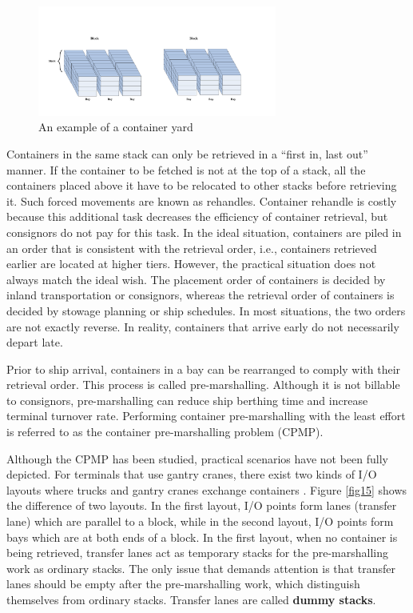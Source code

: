 \documentclass[review,3p,times,authoryear,12pt]{elsarticle}
\begin{document}
\begin{figure}[!htb]
\centering
\includegraphics[width=0.7\textwidth]{fig1.pdf}
\caption{An example of a container yard}
\label{fig:1}
\end{figure}

Containers in the same stack can only be retrieved in a ``first in, last out'' manner.
If the container to be fetched is not at the top of a stack, all the containers placed above it have to be relocated to other stacks before retrieving it.
Such forced movements are known as rehandles.
Container rehandle is costly because this additional task decreases the efficiency of container retrieval, but consignors do not pay for this task.
In the ideal situation, containers are piled in an order that is consistent with the retrieval order, i.e., containers retrieved earlier are located at higher tiers.
However, the practical situation does not always match the ideal wish.
The placement order of containers is decided by inland transportation or consignors, whereas the retrieval order of containers is decided by stowage planning or ship schedules. In most situations, the two orders are not exactly reverse. In reality, containers that arrive early do not necessarily depart late.

Prior to ship arrival, containers in a bay can be rearranged to comply with their retrieval order.
This process is called pre-marshalling.
Although it is not billable to consignors, pre-marshalling can reduce ship berthing time and increase terminal turnover rate.
Performing container pre-marshalling with the least effort is referred to as the container pre-marshalling problem (CPMP).

Although the CPMP has been studied, practical scenarios have not been fully depicted.
For terminals that use gantry cranes, there exist two kinds of I/O layouts where trucks and gantry cranes exchange containers \citep{Carlo2014}.
Figure \ref{fig15} shows the difference of two layouts.
In the first layout, I/O points form lanes (transfer lane) which are parallel to a block, while in the second layout, I/O points form bays which are at both ends of a block.
In the first layout, when no container is being retrieved, transfer lanes act as temporary stacks for the pre-marshalling work as ordinary stacks.
The only issue that demands attention is that transfer lanes should be empty after the pre-marshalling work, which distinguish themselves from ordinary stacks.
Transfer lanes are called \textbf{dummy stacks}.
\end{document}
